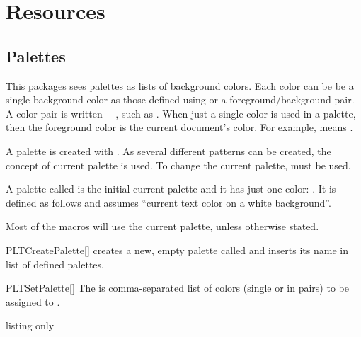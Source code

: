 \documentclass[a4paper, 11pt]{article}
\begin{document}
\section{Resources}

\subsection{Palettes}\label{sec:palettes}

This packages sees palettes as lists of background colors. Each color can be be a single background color as those defined using  or a foreground/background pair. A color pair is written ~~, such as . When just a single color is used in a palette, then the foreground color is the current document's color. For example,  means .

A palette is created with . As several different patterns can be created, the concept of current palette is used. To change the current palette,  must be used.

A palette called  is the initial current palette and it has just one color: . It is defined as follows and assumes ``current text color on a white background''.

\begin{latexcode}
\end{latexcode}

Most of the macros will use the current palette, unless otherwise stated.

\begin{macro}{PLTCreatePalette}[]
     creates a new, empty palette called  and inserts its name in list of defined palettes.
\end{macro}

\begin{macro}{PLTSetPalette}[]
    The  is comma-separated list of colors (single or in pairs) to be assigned to .
\end{macro}

\begin{tcblisting}{listing only}
\end{tcblisting}
\end{document}
